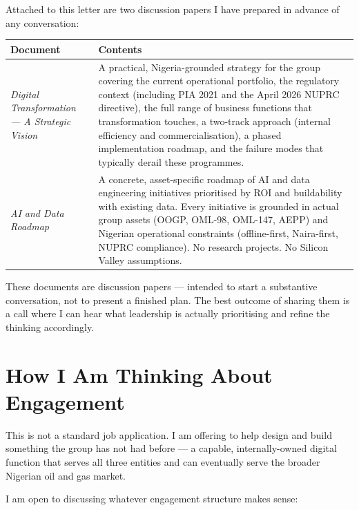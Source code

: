\documentclass[10pt]{article}
\begin{document}
Attached to this letter are two discussion papers I have prepared
in advance of any conversation:

\vspace{4pt}
\small
\begin{tabularx}{\columnwidth}{@{}lX@{}}
\toprule
\textbf{Document} & \textbf{Contents} \\
\midrule
\textit{Digital Transformation --- A Strategic Vision}
  & A practical, Nigeria-grounded strategy for the group covering the
    current operational portfolio, the regulatory context (including PIA 2021
    and the April 2026 NUPRC directive), the full range of business functions
    that transformation touches, a two-track approach (internal efficiency and
    commercialisation), a phased implementation roadmap, and the failure modes
    that typically derail these programmes. \\[4pt]
\textit{AI and Data Roadmap}
  & A concrete, asset-specific roadmap of AI and data engineering initiatives
    prioritised by ROI and buildability with existing data. Every initiative
    is grounded in actual group assets (OOGP, OML-98, OML-147, AEPP) and
    Nigerian operational constraints (offline-first, Naira-first, NUPRC
    compliance). No research projects. No Silicon Valley assumptions. \\
\bottomrule
\end{tabularx}
\normalsize

\vspace{4pt}
These documents are discussion papers --- intended to start a substantive
conversation, not to present a finished plan. The best outcome of sharing
them is a call where I can hear what leadership is actually prioritising and
refine the thinking accordingly.

\vspace{6pt}

\section{How I Am Thinking About Engagement}

This is not a standard job application. I am offering to help design and
build something the group has not had before --- a capable, internally-owned
digital function that serves all three entities and can eventually serve the
broader Nigerian oil and gas market.

I am open to discussing whatever engagement structure makes sense:
\end{document}
